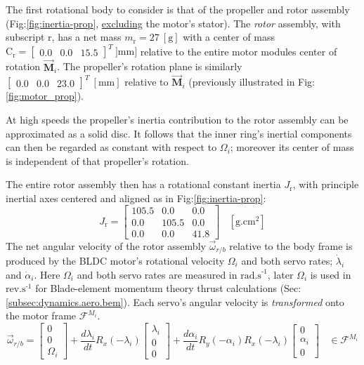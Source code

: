\par
The first rotational body to consider is that of the propeller and rotor assembly (Fig:\ref{fig:inertia-prop}, \underline{excluding} the motor's stator). The \emph{rotor} assembly, with subscript r, has a net mass $m_{\text{r}}=27~[\text{g}]$ with a center of mass $\text{C}_{\text{r}}=\begin{bmatrix}0.0&0.0&15.5\end{bmatrix}^T~]\text{mm}]$ relative to the entire motor modules center of rotation $\vec{\mathbf{M}}_i$. The propeller's rotation plane is similarly $\begin{bmatrix}0.0&0.0&23.0\end{bmatrix}^T~[\text{mm}]$ relative to $\vec{\mathbf{M}}_i$ (previously illustrated in Fig:\ref{fig:motor_prop}). 
\par
At high speeds the propeller's inertia contribution to the rotor assembly can be approximated as a solid disc. It follows that the inner ring's inertial components can then be regarded as constant with respect to $\Omega_i$; moreover its center of mass is independent of that propeller's rotation. 
\par
The entire rotor assembly then has a rotational constant inertia $J_\text{r}$, with principle inertial axes centered and aligned as in Fig:\ref{fig:inertia-prop}:
\begin{equation}\label{eq:prop-inertia}
J_\text{r}=\begin{bmatrix}
105.5 & 0.0 & 0.0\\
0.0 & 105.5 & 0.0\\
0.0 & 0.0 & 41.8
\end{bmatrix}~~~~[\text{g.cm}^2]
\end{equation}
The net angular velocity of the rotor assembly $\vec{\omega}_{r/b}$ relative to the body frame is produced by the BLDC motor's rotational velocity $\Omega_i$ and both servo rates; $\dot{\lambda}_i$ and $\dot{\alpha}_i$. Here $\Omega_i$ and both servo rates are measured in $\text{rad.s}^{\text{-}1}$, later $\Omega_i$ is used in $\text{rev.s}^{\text{-}1}$ for Blade-element momentum theory thrust calculations (Sec:\ref{subsec:dynamics.aero.bem}). Each servo's angular velocity is \emph{transformed} onto the motor frame $\mathcal{F}^{M_i}$.
\begin{equation}\label{eq:net-angular-rot}
\vec{\omega}_{r/b}=\begin{bmatrix}
0\\
0\\
\Omega_i
\end{bmatrix}
+\frac{d\lambda_i}{dt}R_x(-\lambda_i)\begin{bmatrix}
\lambda_i\\
0\\
0
\end{bmatrix}+\frac{d\alpha_i}{dt}R_y(-\alpha_i)R_x(-\lambda_i)\begin{bmatrix}
0\\
\alpha_i\\
0
\end{bmatrix}~~~~\in\mathcal{F}^{M_i}
\end{equation}
